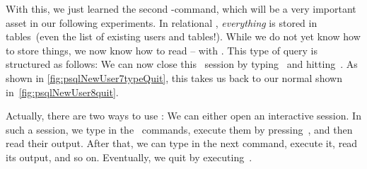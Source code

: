 With this, we just learned the second \sql-command, which will be a very important asset in our following experiments.
In relational , \emph{everything} is stored in tables~(even the list of existing users and tables!).
While we do not yet know how to store things, we now know how to read -- with .
This type of query is structured as follows:%
%
%
%
We can now close this \psql\ session by typing~\sqlil{\\q} and hitting~\keys{\enter}.
As shown in \cref{fig:psqlNewUser7typeQuit}, this takes us back to our normal   shown in~\cref{fig:psqlNewUser8quit}.

Actually, there are two ways to use \psql:
We can either open an interactive session.
In such a session, we type in the \sql\ commands, execute them by pressing~\keys{\enter}, and then read their output.
After that, we can type in the next command, execute it, read its output, and so on.
Eventually, we quit by executing~\sqlil{\\q}.


